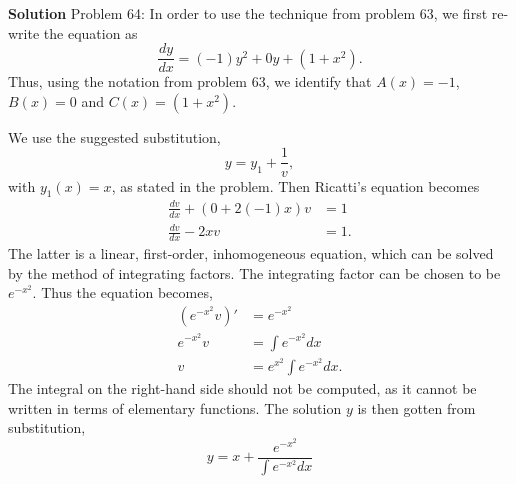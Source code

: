 \documentclass[12pt,oneside]{exam}
\newenvironment{newsolution}{\vspace{.1in}\noindent\textbf{Solution \hspace{.05em}}}{}
\begin{document}
\begin{newsolution}
Problem 64: In order to use the technique from problem 63, we first re-write the equation as 
\begin{equation*}
\frac{dy}{dx} = (-1)y^2 + 0y + (1+x^2).
\end{equation*}
Thus, using the notation from problem 63, we identify that $A(x)=-1$, $B(x)=0$ and $C(x)=(1+x^2)$. 

We use the suggested substitution, 
\begin{equation*}
y=y_1+\frac{1}{v},
\end{equation*}
with $y_1(x)=x$, as stated in the problem. Then Ricatti's equation becomes 
\begin{align*}
\frac{dv}{dx} + (0 + 2(-1)x)v & =1\\
\frac{dv}{dx} -2xv & = 1.
\end{align*}
The latter is a linear, first-order, inhomogeneous equation, which can be solved by the method of integrating factors. The integrating factor can be chosen to be $e^{-x^2}$. Thus the equation becomes, 
\begin{align*}
(e^{-x^2}v)' & =e^{-x^2}\\
e^{-x^2}v & = \int e^{-x^2}dx \\
v & = e^{x^2}\int e^{-x^2}dx.
\end{align*}
The integral on the right-hand side should not be computed, as it cannot be written in terms of elementary functions. The solution $y$ is then gotten from substitution, 
\begin{equation*}
y = x+ \frac{e^{-x^2}}{\int e^{-x^2}dx}
\end{equation*}
\end{newsolution}
\end{document}
